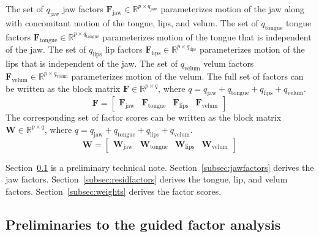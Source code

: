\documentclass[reprint]{JASAnew}\usepackage[]{graphicx}\usepackage[]{color}
\begin{document}
The set of $q_\text{jaw}$ jaw factors $\mathbf{F}_\text{jaw} \in \mathbb{R}^{p\times q_\text{jaw}}$ parameterizes motion of the jaw along with concomitant motion of the tongue, lips, and velum.
%
The set of $q_\text{tongue}$ tongue factors $\mathbf{F}_\text{tongue} \in \mathbb{R}^{p\times q_\text{tongue}}$ parameterizes motion of the tongue that is independent of the jaw. 
%
The set of $q_\text{lips}$ lip factors $\mathbf{F}_\text{lips} \in \mathbb{R}^{p\times q_\text{lips}}$ parameterizes motion of the lips that is independent of the jaw.
%
The set of $q_\text{velum}$ velum factors $\mathbf{F}_\text{velum} \in \mathbb{R}^{p\times q_\text{velum}}$ parameterizes motion of the velum.
%
The full set of factors can be written as the block matrix $\mathbf{F} \in \mathbb{R}^{p\times q}$, where $q=q_\text{jaw}+q_\text{tongue}+q_\text{lips}+q_\text{velum}$. 
% 
\begin{equation}
\label{eq:Fblock}
\mathbf{F} = 
\left[
\begin{array}{c|c|c|c}
\mathbf{F}_\text{jaw} 
& \mathbf{F}_\text{tongue}
& \mathbf{F}_\text{lips}
& \mathbf{F}_\text{velum}
\end{array}
\right]
\end{equation}
%
The corresponding set of factor scores can be written as the block matrix $\mathbf{W} \in \mathbb{R}^{p\times q}$, where $q=q_\text{jaw}+q_\text{tongue}+q_\text{lips}+q_\text{velum}$. 
% 
\begin{equation}
\label{eq:Wblock}
\mathbf{W} = 
\left[
\begin{array}{c|c|c|c}
\mathbf{W}_\text{jaw} 
& \mathbf{W}_\text{tongue}
& \mathbf{W}_\text{lips}
& \mathbf{W}_\text{velum}
\end{array}
\right]
\end{equation}

Section~\ref{subsec:preliminaries} is a preliminary technical note. Section~\ref{subsec:jawfactors} derives the jaw factors. Section~\ref{subsec:residfactors} derives the tongue, lip, and velum factors. Section~\ref{subsec:weights} derives the factor scores. 





\subsection{Preliminaries to the guided factor analysis}
\label{subsec:preliminaries}
\end{document}
